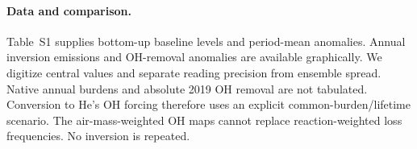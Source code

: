 \documentclass[11pt]{article}
\begin{document}
\paragraph{Data and comparison.} Table~S1 supplies bottom-up baseline levels
and period-mean anomalies. Annual inversion emissions and OH-removal anomalies
are available graphically. We digitize central values and separate reading
precision from ensemble spread. Native annual burdens and absolute 2019 OH
removal are not tabulated. Conversion to He's OH forcing therefore uses an
explicit common-burden/lifetime scenario. The air-mass-weighted OH maps cannot
replace reaction-weighted loss frequencies. No inversion is repeated.
\end{document}
